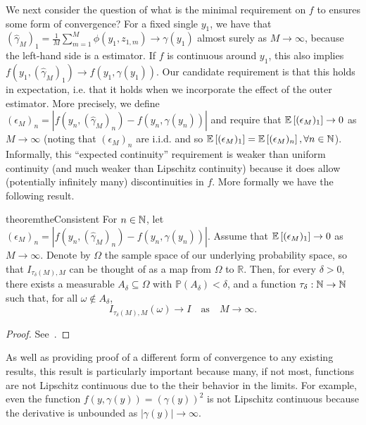 We next consider the question of what is the minimal requirement on $f$ to ensures some form of
convergence? For a fixed single $y_1$, we
have that $(\hat{\gamma}_M)_1=\frac{1}{M}\sum_{m=1}^{M} \phi(y_1,z_{1,m})\rightarrow\gamma(y_1)$ 
almost surely as $M \rightarrow \infty$, because the left-hand side is a \mc estimator. If $f$ is continuous
around $y_1$, this also implies $f(y_1,(\hat{\gamma}_M)_1) \rightarrow
f(y_1,\gamma(y_1))$.  Our candidate requirement is that this holds in
expectation, i.e. that it holds when we incorporate the effect of the outer estimator.
More precisely, we define $(\epsilon_M)_n = \left|f(y_n, (\hat{\gamma}_M)_n) -
f(y_n,\gamma(y_n))\right|$ and require that $\mathbb{E}\left[(\epsilon_M)_1\right] \to 0$ as $M
\to \infty$ (noting that $(\epsilon_M)_n$ are i.i.d. and so
$\mathbb{E}\left[(\epsilon_M)_1\right] = \mathbb{E}\left[(\epsilon_M)_n\right], \forall n\in\mathbb{N}$). Informally, this ``expected continuity''
requirement is weaker than uniform continuity (and much weaker than Lipschitz continuity)
because it does allow (potentially infinitely
many) discontinuities in $f$.  More formally we have the following result.
\vspace{-8pt}
\begin{restatable}{theorem}{theConsistent} \label{the:Consistent}
	For $n \in \mathbb{N}$, let $
	(\epsilon_M)_n = \left|f(y_n, (\hat{\gamma}_M)_n) - f(y_n, \gamma(y_n))\right|.$
  Assume that $\mathbb{E}\left[(\epsilon_M)_1\right] \to 0$  as $M \to \infty$. Denote by $\Omega$
  the sample space of our underlying probability space, so that $I_{\tau_\delta(M),M}$ can
  be thought of as a map from $\Omega$ to $\mathbb{R}$. Then, for every $\delta > 0$,
  there exists a measurable $A_\delta \subseteq \Omega$ with $\mathbb{P}(A_\delta) <
  \delta$, and a function $\tau_\delta : \mathbb{N} \to \mathbb{N}$ such that, for all $\omega\not\in
  A_\delta$,
  \vspace{-4pt}
	\[ 
		I_{\tau_\delta(M),M}(\omega) \to I\quad\mbox{as}\quad M \to \infty.
	\]
\end{restatable}
\vspace{-14pt}
\begin{proof}
	See~\citep{rainforth2017pitfalls}.
\end{proof}
\noindent As well as providing proof of a different form of convergence to any existing results, this
result is particularly important because many, if not most, functions are not Lipschitz
continuous due to the their behavior in the limits.  For example, even the function $f(y,\gamma(y)) = \left(\gamma(y)\right)^2$
is not Lipschitz continuous because the derivative is unbounded as $\left|\gamma(y)\right|\rightarrow\infty$.
